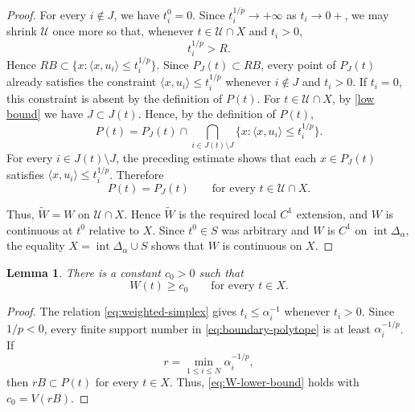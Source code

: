 \documentclass[12pt,reqno]{amsart}
\numberwithin{equation}{section}
\newtheorem{lemma}[theorem]{Lemma}
\theoremstyle{remark}
\begin{document}
\begin{proof}
	For every \(i\notin J\), we have \(t_i^0=0\). Since
	\(t_i^{1/p}\to+\infty\) as \(t_i\to0+\), we may shrink
	\(\mathcal U\) once more so that, whenever
	\(t\in\mathcal U\cap X\) and \(t_i>0\),
	\[
	t_i^{1/p}>R.
	\]
	Hence \(RB\subset\{x:\langle x,u_i\rangle\leq t_i^{1/p}\}\).
	Since \(P_J(t)\subset RB\), every point of \(P_J(t)\) already satisfies
	the constraint \(\langle x,u_i\rangle\leq t_i^{1/p}\) whenever
	\(i\notin J\) and \(t_i>0\). If \(t_i=0\), this constraint is absent by
	the definition of \(P(t)\). For \(t\in\mathcal U\cap X\), by \eqref{low bound} we have \(J\subset J(t)\). Hence, by the definition of
	\(P(t)\),
	\[
	P(t)
	=
	P_J(t)\cap
	\bigcap_{i\in J(t)\setminus J}
	\{x:\langle x,u_i\rangle\leq t_i^{1/p}\}.
	\]
	For every \(i\in J(t)\setminus J\), the preceding estimate shows that
	each \(x\in P_J(t)\) satisfies
	\(\langle x,u_i\rangle\leq t_i^{1/p}\). Therefore
	\[
	P(t)=P_J(t)
	\qquad
	\text{for every }t\in\mathcal U\cap X.
	\]
	
Thus, \(\widetilde W=W\) on \(\mathcal U\cap X\). Hence
\(\widetilde W\) is the required local \(C^1\) extension, and \(W\)
is continuous at \(t^0\) relative to \(X\). Since \(t^0\in S\)
was arbitrary and \(W\) is \(C^1\) on
\(\operatorname{int}\Delta_\alpha\), the equality
\(X=\operatorname{int}\Delta_\alpha\cup S\) shows that \(W\) is
continuous on \(X\).   
	

\end{proof}





\begin{lemma}\label{lem:W-lower-bound}
There is a constant $c_0>0$ such that
\begin{equation}\label{eq:W-lower-bound}
 W(t)\geq c_0
 \qquad\text{for every }t\in X.
\end{equation}
\end{lemma}

\begin{proof}
The relation \eqref{eq:weighted-simplex} gives $t_i\leq\alpha_i^{-1}$ whenever $t_i>0$. Since $1/p<0$, every finite support number in \eqref{eq:boundary-polytope} is at least $\alpha_i^{-1/p}$. If
\begin{equation}\label{eq:fixed-inner-radius}
 r=\min_{1\leq i\leq N}\alpha_i^{-1/p},
\end{equation}
then $rB\subset P(t)$ for every $t\in X$. Thus, \eqref{eq:W-lower-bound} holds with $c_0=V(rB)$.
\end{proof}
\end{document}
